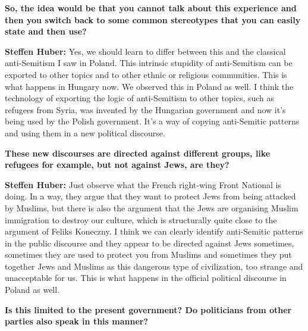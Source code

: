 \textbf{So, the idea would be that you cannot talk about this experience and then you switch back to some common stereotypes that you can easily state and then use?} 

\textbf{Steffen Huber:} Yes, we should learn to differ between this and the classical anti-Semitism I saw in Poland. This intrinsic stupidity of anti-Semitism can be exported to other topics and to other ethnic or religious communities. This is what happens in Hungary now. We observed this in Poland as well. I think the technology of exporting the logic of anti-Semitism to other topics, such as refugees from Syria, was invented by the Hungarian government and now it's being used by the Polish government. It’s a way of copying anti-Semitic patterns and using them in a new political discourse. 

\textbf{These new discourses are directed against different groups, like refugees for example, but not against Jews, are they?}  

\textbf{Steffen Huber:} Just observe what the French right-wing Front National is doing. In a way, they argue that they want to protect Jews from being attacked by Muslims, but there is also the argument that the Jews are organising Muslim immigration to destroy our culture, which is structurally quite close to the argument of Feliks Koneczny. I think we can clearly identify anti-Semitic patterns in the public discourse and they appear to be directed against Jews sometimes, sometimes they are used to protect you from Muslims and sometimes they put together Jews and Muslims as this dangerous type of civilization, too strange and unacceptable for us. This is what happens in the official political discourse in Poland as well. 

\textbf{Is this limited to the present government? Do politicians from other parties also speak in this manner?} 

